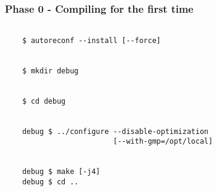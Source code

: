 \begin{frame}[fragile]
  \frametitle{Phase 0 - Compiling \opensmt for the first time}

  \begin{verbatim}

    $ autoreconf --install [--force]


    $ mkdir debug


    $ cd debug


    debug $ ../configure --disable-optimization 
                         [--with-gmp=/opt/local]


    debug $ make [-j4]
    debug $ cd ..

  \end{verbatim}

\end{frame}

